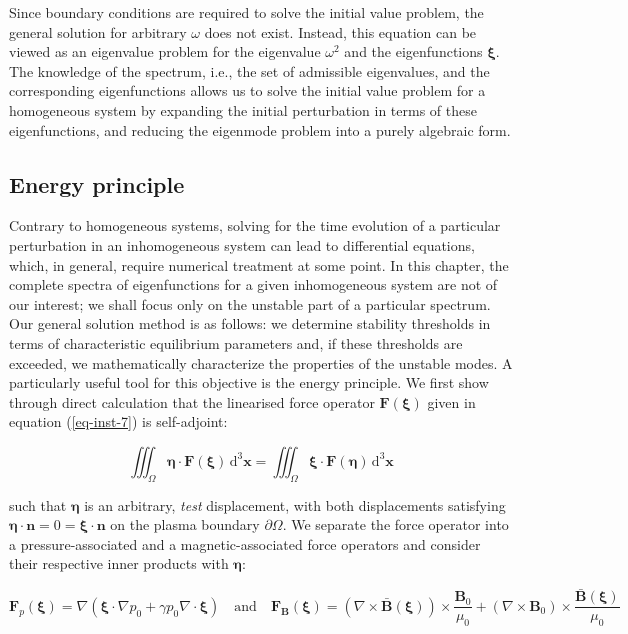 Since boundary conditions are required to solve the initial value problem, the general solution for arbitrary $\omega$ does not exist. Instead, this equation can be viewed as an eigenvalue problem for the eigenvalue $\omega^2$ and the eigenfunctions $\boldsymbol{\xi}$. The knowledge of the spectrum, i.e., the set of admissible eigenvalues, and the corresponding eigenfunctions allows us to solve the initial value problem for a homogeneous system by expanding the initial perturbation in terms of these eigenfunctions, and reducing the eigenmode problem into a purely algebraic form.

\subsection{Energy principle}

Contrary to homogeneous systems, solving for the time evolution of a particular perturbation in an inhomogeneous system can lead to differential equations, which, in general, require numerical treatment at some point. In this chapter, the complete spectra of eigenfunctions for a given inhomogeneous system are not of our interest; we shall focus only on the unstable part of a particular spectrum. Our general solution method is as follows: we determine stability thresholds in terms of characteristic equilibrium parameters and, if these thresholds are exceeded, we mathematically characterize the properties of the unstable modes. A particularly useful tool for this objective is the energy principle. We first show through direct calculation that the linearised force operator $\mathbf{F}(\boldsymbol{\xi})$ given in equation (\ref{eq-inst-7}) is self-adjoint:

\begin{equation}
    \iiint_{\Omega}\boldsymbol{\eta}\cdot\mathbf{F}(\boldsymbol{\xi})\,\mathrm{d}^3\mathbf{x}=\iiint_\Omega\boldsymbol{\xi}\cdot\mathbf{F}(\boldsymbol{\eta})\,\mathrm{d}^3\mathbf{x}
\end{equation}

such that $\boldsymbol{\eta}$ is an arbitrary, \textit{test} displacement, with both displacements satisfying $\boldsymbol{\eta}\cdot\mathbf{n}=0=\boldsymbol{\xi}\cdot\mathbf{n}$ on the plasma boundary $\partial\Omega$. We separate the force operator into a pressure-associated and a magnetic-associated force operators and consider their respective inner products with $\boldsymbol{\eta}$:

\begin{equation}
    \mathbf{F}_p(\boldsymbol{\xi})=\nabla(\boldsymbol{\xi}\cdot\nabla p_0+\gamma p_0\nabla\cdot\boldsymbol{\xi})\quad\text{and}\quad\mathbf{F}_\mathbf{B}(\boldsymbol{\xi})=(\nabla\times\bar{\mathbf{B}}(\boldsymbol{\xi}))\times\frac{\mathbf{B}_0}{\mu_0}+(\nabla\times\mathbf{B}_0)\times\frac{\bar{\mathbf{B}}(\boldsymbol{\xi})}{\mu_0}
\end{equation}

